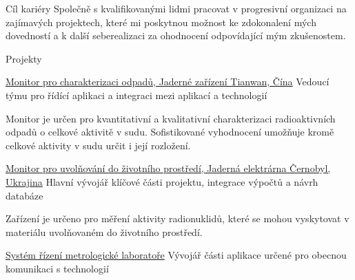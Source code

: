 \documentclass{cv} %
\begin{document}
\begin{rSection}{Cíl kariéry}
 Společně s kvalifikovanými lidmi pracovat v progresivní organizaci na zajímavých projektech, které mi poskytnou možnost ke zdokonalení mých dovedností a k další seberealizaci za ohodnocení odpovídající mým zkušenostem.
\end{rSection}
\begin{rSection}{Projekty}
\begin{rSubsection}
{\href{https://www.vfnuclear.com/cz/produkty/de-monitor-pro-charakterizaci-odpadu}{Monitor pro charakterizaci odpadů, Jaderné zařízení Tianwan, Čína}}{}
{Vedoucí týmu pro řídící aplikaci a integraci mezi aplikací a technologií}{}

Monitor je určen pro kvantitativní a kvalitativní charakterizaci radioaktivních odpadů o celkové aktivitě v sudu. Sofistikované vyhodnocení umožňuje kromě celkové aktivity v sudu určit i její rozložení.
\end{rSubsection}

\begin{rSubsection}
{\href{https://www.vfnuclear.com/cz/dodavka-monitoru-frm-03-pro-uvolnovani-do-zivotniho-prostredi-do-cernobylske-je}{Monitor pro uvolňování do životního prostředí, Jaderná elektrárna Černobyl, Ukrajina}}{}
{Hlavní vývojář klíčové části projektu, integrace výpočtů a návrh databáze}{}

Zařízení je určeno pro měření aktivity radionuklidů, které se mohou vyskytovat v materiálu uvolňovaném do životního prostředí. 
\end{rSubsection}



\begin{rSubsection}
{\href{https://www.vfnuclear.com/cz/produkty/system-rizeni-metrologicke-laboratore-dars}{Systém řízení metrologické laboratoře}}{}
{Vývojář části aplikace určené pro obecnou komunikaci s technologií}{}


\end{rSubsection}
\end{rSection}
\end{document}

